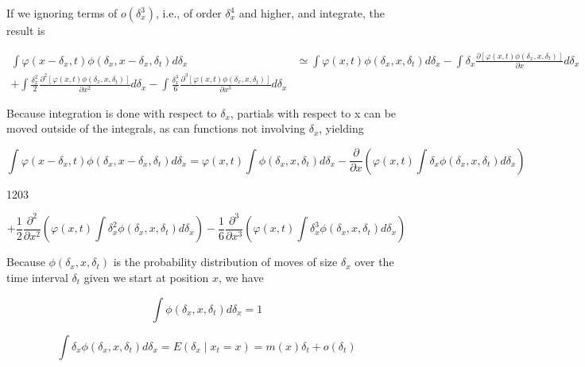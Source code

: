 \documentclass{article}
\begin{document}
If we ignoring terms of  $ o(\delta_{x}^{3}) $, i.e., of order  $ \delta_{x}^{4} $ and higher, and integrate, the result is

\begin{equation}
\begin{align*}\int\varphi(x-\delta_{x},t)\phi(\delta_{x},x-\delta_{x},\delta_{t})d\delta_{x}&\simeq\int\varphi(x,t)\phi(\delta_{x},x,\delta_{t})d\delta_{x}-\int\delta_{x}\frac{\partial[\varphi(x,t)\phi(\delta_{x},x,\delta_{t})]}{\partial x}d\delta_{x}\\+\int\frac{\delta_{x}^{2}}{2}\frac{\partial^{2}[\varphi(x,t)\phi(\delta_{x},x,\delta_{t})]}{\partial x^{2}}d\delta_{x}-\int\frac{\delta_{x}^{3}}{6}\frac{\partial^{3}[\varphi(x,t)\phi(\delta_{x},x,\delta_{t})]}{\partial x^{3}}d\delta_{x}\end{align*}
\end{equation}

Because integration is done with respect to  $ \delta_{x} $, partials with respect to x can be moved outside of the integrals, as can functions not involving  $ \delta_{x} $, yielding

\begin{equation}
\int\varphi(x-\delta_{x},t)\phi(\delta_{x},x-\delta_{x},\delta_{t})d\delta_{x}=\varphi(x,t)\int\phi(\delta_{x},x,\delta_{t})d\delta_{x}-\frac{\partial}{\partial x}\left(\varphi(x,t)\int\delta_{x}\phi(\delta_{x},x,\delta_{t})d\delta_{x}\right)
\end{equation}

1203

\begin{equation}
+\frac{1}{2}\frac{\partial^{2}}{\partial x^{2}}\left(\varphi(x,t)\int\delta_{x}^{2}\phi(\delta_{x},x,\delta_{t})d\delta_{x}\right)-\frac{1}{6}\frac{\partial^{3}}{\partial x^{3}}\left(\varphi(x,t)\int\delta_{x}^{3}\phi(\delta_{x},x,\delta_{t})d\delta_{x}\right)
\end{equation}

Because  $ \phi(\delta_x, x, \delta_t) $ is the probability distribution of moves of size  $ \delta_x $ over the time interval  $ \delta_t $ given we start at position  $ x $, we have

\begin{equation}
\int\phi(\delta_{x},x,\delta_{t})d\delta_{x}=1
\end{equation}

\begin{equation}
\int\delta_{x}\phi(\delta_{x},x,\delta_{t})d\delta_{x}=E\left(\delta_{x}\mid x_{t}=x\right)=m(x)\delta_{t}+o(\delta_{t})
\end{equation}
\end{document}
